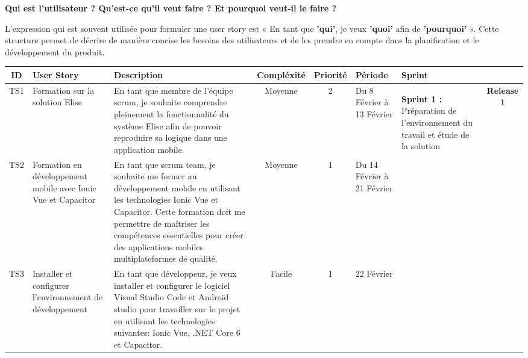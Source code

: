   \textbf{Qui est l'utilisateur ? Qu'est-ce qu'il veut faire ? Et pourquoi veut-il le faire ?}

L'expression qui est souvent utilisée pour formuler une user story est « En tant que \textbf{'qui'}, je veux \textbf{'quoi'} afin de \textbf{'pourquoi'} ». Cette structure permet de décrire de manière concise les besoins des utilisateurs et de les prendre en compte dans la planification et le développement du produit.


\newpage
\begin{landscape}



  \begin{adjustwidth}{-1cm}{}
      
      \begin{longtable}{|c|p{3cm}|p{8cm}|c|c|p{2cm}|p{2cm}|c|}
        \hline
    ID  &   User Story  &  Description   &  Compléxité  &  Priorité  &  Période  &  Sprint  &   \\
    \hline
    TS1  &  Formation sur la solution Elise  &  En tant que membre de l'équipe scrum, je souhaite comprendre pleinement la fonctionnalité du système Elise afin de pouvoir reproduire sa logique dans une application mobile.   &  Moyenne  &  2  &  Du 8 Février à 13  Février  &  \multirow{3}{2cm}{
      \begin{center}
        
        \textbf{Sprint 1 :} Préparation de l’environnement du travail et étude de la solution
      \end{center}
      }  &  \multirow{19}{2.5cm}[-10.5ex]{\textbf{Release 1}}  \\
    \cline{1-6}
    TS2  &  Formation en développement mobile avec Ionic Vue et Capacitor  &  En tant que scrum team, je souhaite me former au développement mobile en utilisant les technologies Ionic Vue et Capacitor. Cette formation doit me permettre de maîtriser les compétences essentielles pour créer des applications mobiles multiplateformes de qualité.  &  Moyenne  &  1  &  Du 14 Février à 21 Février  &  &  \\
    \cline{1-6}
    TS3  &  Installer et configurer l'environnement de développement  &  En tant que développeur, je veux installer et configurer le logiciel Visual Studio Code et Android studio pour travailler sur le projet en utilisant les technologies suivantes: Ionic Vue, .NET Core 6 et Capacitor.  &  Facile  &  1  &  22 Février  &  & \\


\end{longtable}
\end{adjustwidth}
\end{landscape}
